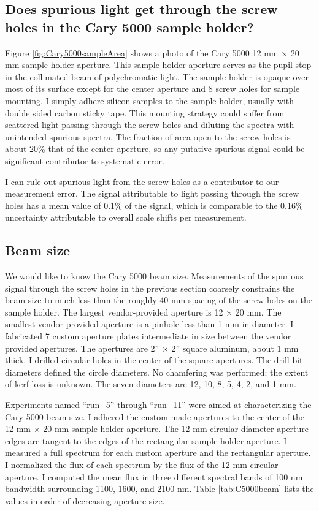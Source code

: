 \newpage


\subsection{Does spurious light get through the screw holes in the Cary 5000 sample holder?}
Figure \ref{fig:Cary5000sampleArea} shows a photo of the Cary 5000 12 mm $\times$ 20 mm sample holder aperture.  This sample holder aperture serves as the pupil stop in the collimated beam of polychromatic light.  The sample holder is opaque over most of its surface except for the center aperture and 8 screw holes for sample mounting.  I simply adhere silicon samples to the sample holder, usually with double sided carbon sticky tape.  This mounting strategy could suffer from scattered light passing through the screw holes and diluting the spectra with unintended spurious spectra.  The fraction of area open to the screw holes is about 20\% that of the center aperture, so any putative spurious signal could be significant contributor to systematic error.

I can rule out spurious light from the screw holes as a contributor to our measurement error.  The signal attributable to light passing through the screw holes has a mean value of 0.1\% of the signal, which is comparable to the 0.16\% uncertainty attributable to overall scale shifts per measurement.   

\subsection{Beam size}
We would like to know the Cary 5000 beam size.  Measurements of the spurious signal through the screw holes in the previous section coarsely constrains the beam size to much less than the roughly 40 mm spacing of the screw holes on the sample holder.  The largest vendor-provided aperture is 12 $\times$ 20 mm.  The smallest vendor provided aperture is a pinhole less than 1 mm in diameter.  I fabricated 7 custom aperture plates intermediate in size between the vendor provided apertures.  The apertures are 2'' $\times$ 2'' square aluminum, about 1 mm thick.  I drilled circular holes in the center of the square apertures.  The drill bit diameters defined the circle diameters.  No chamfering was performed; the extent of kerf loss is unknown.  The seven diameters are 12, 10, 8, 5, 4, 2, and 1 mm.  

Experiments named ``run\_5'' through ``run\_11'' were aimed at characterizing the Cary 5000 beam size.  I adhered the custom made apertures to the center of the 12 mm $\times$ 20 mm sample holder aperture.  The 12 mm circular diameter aperture edges are tangent to the edges of the rectangular sample holder aperture.  I measured a full spectrum for each custom aperture and the rectangular aperture.  I normalized the flux of each spectrum by the flux of the 12 mm circular aperture.  I computed the mean flux in three different spectral bands of 100 nm bandwidth surrounding 1100, 1600, and 2100 nm.  Table \ref{tab:C5000beam} lists the values in order of decreasing aperture size.  


